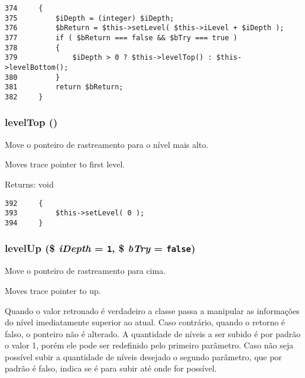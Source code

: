 \begin{Code}\begin{verbatim}374     {
375         $iDepth = (integer) $iDepth;
376         $bReturn = $this->setLevel( $this->iLevel + $iDepth );
377         if ( $bReturn === false && $bTry === true )
378         {
379             $iDepth > 0 ? $this->levelTop() : $this->levelBottom();
380         }
381         return $bReturn;
382     }
\end{verbatim}
\end{Code}


\hypertarget{class_back_trace_6991034797ac2852fc2f487f12d0993c}{
\subsubsection[{levelTop}]{\setlength{\rightskip}{0pt plus 5cm}levelTop ()}}
\label{class_back_trace_6991034797ac2852fc2f487f12d0993c}


Move o ponteiro de rastreamento para o nível mais alto.

Moves trace pointer to first level.

\begin{Desc}
\item[Returns:]void \end{Desc}


\begin{Code}\begin{verbatim}392     {
393         $this->setLevel( 0 );
394     }
\end{verbatim}
\end{Code}


\hypertarget{class_back_trace_89e47a095ea0bb56352b6fdf68740eb0}{
\subsubsection[{levelUp}]{\setlength{\rightskip}{0pt plus 5cm}levelUp (\$ {\em iDepth} = {\tt 1}, \/  \$ {\em bTry} = {\tt false})}}
\label{class_back_trace_89e47a095ea0bb56352b6fdf68740eb0}


Move o ponteiro de rastreamento para cima.

Moves trace pointer to up.

Quando o valor retronado é verdadeiro a classe passa a manipular as informações do nível imediatamente superior ao atual. Caso contrário, quando o retorno é falso, o ponteiro não é alterado. A quantidade de níveis a ser subido é por padrão o valor 1, porém ele pode ser redefinido pelo primeiro parâmetro. Caso não seja possível subir a quantidade de níveis desejado o segundo parâmetro, que por padrão é falso, indica se é para subir até onde for possível.

